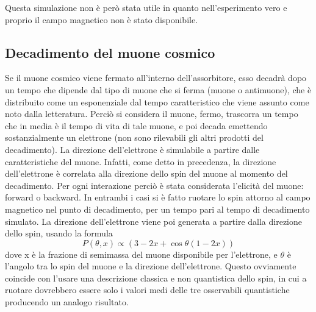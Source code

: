 Questa simulazione non \`e per\`o stata utile in quanto nell'esperimento vero e proprio il campo magnetico non \`e stato disponibile.


\subsection{Decadimento del muone cosmico}
Se il muone cosmico viene fermato all'interno dell'assorbitore, esso decadrà dopo un tempo che dipende dal tipo di muone che si ferma (muone o antimuone), che è distribuito
come un esponenziale dal tempo caratteristico che viene assunto come noto dalla letteratura. Perciò si considera il muone, fermo, trascorra un tempo che in media è il tempo
di vita di tale muone, e poi decada emettendo sostanzialmente un elettrone (non sono rilevabili gli altri prodotti del decadimento). La direzione dell'elettrone \`e simulabile a partire dalle caratteristiche del muone. Infatti, come detto in precedenza, la direzione dell'elettrone \`e correlata alla direzione dello spin del muone al momento del decadimento. Per ogni interazione perci\`o \`e stata considerata l'elicit\`a del muone: forward o backward. In entrambi i casi si \`e fatto ruotare lo spin attorno al campo magnetico nel punto di decadimento, per un tempo pari al tempo di decadimento simulato. La direzione dell'elettrone viene poi generata a partire dalla direzione dello spin, usando la formula 
\begin{equation}
	P(\theta, x) \propto \left(3 - 2 x + \cos{\theta}\left(1 - 2 x\right)\right)
\end{equation}
dove x \`e la frazione di semimassa del muone disponibile per l'elettrone, e $\theta$ \`e l'angolo tra lo spin del muone e la direzione dell'elettrone. Questo ovviamente coincide con l'usare una descrizione classica e non quantistica dello spin, in cui a ruotare dovrebbero essere solo i valori medi delle tre osservabili quantistiche producendo un analogo risultato.

